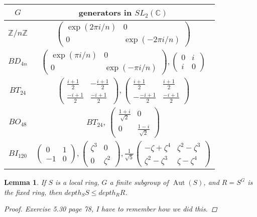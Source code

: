 \documentclass[11pt, a4paper, english]{article}
\numberwithin{prop}{section}
\newtheorem{lemma}{Lemma}
\numberwithin{lemma}{section}
\numberwithin{theorem}{section}
\numberwithin{defin}{section}
\numberwithin{example}{section}
\newcommand{\C}{\mathbb{C}}
\DeclareMathOperator{\Aut}{Aut}
\begin{document}
{\renewcommand{\arraystretch}{2}
\begin{tabular}{|c|c|}
\hline
$G$ & generators in $SL_2(\C)$
\\
\hline
\hline
$\mathbb{Z}/n\mathbb{Z}$ & $\begin{pmatrix}
\exp(2\pi i/n) & 0\\
0 & \exp(-2\pi i/n)
\end{pmatrix} $\\
\hline
$BD_{4n}$ &  $ \begin{pmatrix}
\exp(\pi i/n) & 0\\
0 & \exp(-\pi i/n)
\end{pmatrix}, \begin{pmatrix}
0 & i\\
i & 0
\end{pmatrix} $\\
\hline
$BT_{24}$ & $ \begin{pmatrix}
\frac{i+1}{2} & -\frac{i+1}{2}\\
\frac{-i+1}{2} & \frac{-i+1}{2}
\end{pmatrix}, \begin{pmatrix}
\frac{i+1}{2} & \frac{i+1}{2}\\
-\frac{-i+1}{2} & \frac{-i+1}{2}
\end{pmatrix} $\\
\hline
$BO_{48}$ & $BT_{24}$, $\begin{pmatrix}
\frac{1+i}{\sqrt{2}} & 0\\
0 & \frac{1-i}{\sqrt{2}}
\end{pmatrix}$\\
\hline
$BI_{120}$ & $ \begin{pmatrix}
0 & 1\\
-1 & 0
\end{pmatrix}, \begin{pmatrix}
\zeta^3 & 0\\
0 & \zeta^2
\end{pmatrix}, \frac{1}{\sqrt{5}}\begin{pmatrix}
-\zeta + \zeta^4 & \zeta^2 - \zeta^3\\
\zeta^2 - \zeta^3 & \zeta - \zeta^4
\end{pmatrix}$
\\
\hline
\end{tabular}
}

\begin{lemma}
\label{lem:depth_of_S_less_than_R}
If $S$ is a local ring, $G$ a finite subgroup of $\Aut(S)$, and $R=S^G$ is the fixed ring, then $depth_SS \leq depth_RR$.
\begin{proof}
{\color{red} Exercise 5.30 page 78, I have to remember how we did this.}
\end{proof}
\end{lemma}
\end{document}
